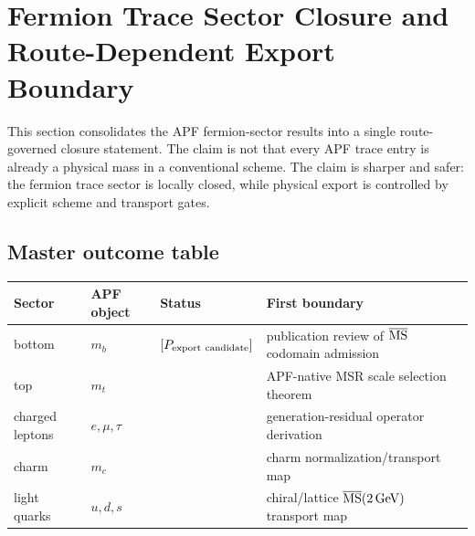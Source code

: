 
\section{Fermion Trace Sector Closure and Route-Dependent Export Boundary}
\label{sec:fermion-sector-master-closure}

This section consolidates the APF fermion-sector results into a single route-governed closure statement.  The claim is not that every APF trace entry is already a physical mass in a conventional scheme.  The claim is sharper and safer: the fermion trace sector is locally closed, while physical export is controlled by explicit scheme and transport gates.

\begin{center}
\end{center}

\subsection{Master outcome table}

\begin{center}
\begin{tabular}{llll}
\hline
Sector & APF object & Status & First boundary \\
\hline
bottom & \(m_b\) & \([P_{\rm export\ candidate}]\) & publication review of \(\overline{\rm MS}\) codomain admission \\
top & \(m_t\) & \([P_{\rm trace}+P_{\rm ext\text{-}MSR}+P_{\rm terminal}] & APF-native MSR scale selection theorem \\
charged leptons & \(e,\mu,\tau\) & \([P_{\rm trace}+P_{\rm norm\ candidate}+P_{\rm residual}] & generation-residual operator derivation \\
charm & \(m_c\) & \([P_{\rm trace}+P_{\overline{\rm MS}\ knockout}] & charm normalization/transport map \\
light quarks & \(u,d,s\) & \([P_{\rm trace}+P_{\rm low\text{-}energy\ QCD}] & chiral/lattice \(\overline{\rm MS}(2\,\mathrm{GeV})\) transport map \\
\hline
\end{tabular}
\end{center}

